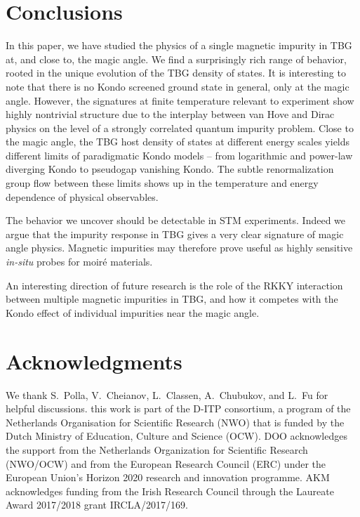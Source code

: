 

\section{Conclusions}
\label{sec:conclusions}
In this paper, we have studied the physics of a single magnetic impurity in TBG at, and close to, the magic angle. We find a surprisingly rich range of behavior, rooted in the unique evolution of the TBG density of states. It is interesting to note that there is no Kondo screened ground state in general, only at the magic angle. However, the signatures at finite temperature relevant to experiment show highly nontrivial structure due to the interplay between van Hove and Dirac physics on the level of a strongly correlated quantum impurity problem. Close to the magic angle, the TBG host density of states at different energy scales yields different limits of paradigmatic Kondo models -- from logarithmic and power-law diverging Kondo to pseudogap vanishing Kondo. The subtle renormalization group flow between these limits shows up in the temperature and energy dependence of physical observables.

The behavior we uncover should be detectable in STM experiments. Indeed we argue that the impurity response in TBG gives a very clear signature of magic angle physics. Magnetic impurities may therefore prove useful as highly sensitive \textit{in-situ} probes for moir\'{e} materials.

An interesting direction of future research is the role of the RKKY interaction between multiple magnetic impurities in TBG, and how it competes with the Kondo effect of individual impurities near the magic angle.



\section*{Acknowledgments}
	We thank S.~Polla, V.~Cheianov, L.~Classen, A.~Chubukov, and L.~Fu for helpful discussions. this work is part of the D-ITP consortium,
	a program of the Netherlands Organisation for Scientific Research (NWO) that is funded by the Dutch Ministry of Education, Culture and Science (OCW). DOO acknowledges the support from the Netherlands Organization for Scientific Research (NWO/OCW) and from the European Research Council (ERC) under the European Union's Horizon 2020 research and innovation programme. AKM acknowledges funding from the Irish Research Council through the Laureate Award 2017/2018 grant IRCLA/2017/169.

